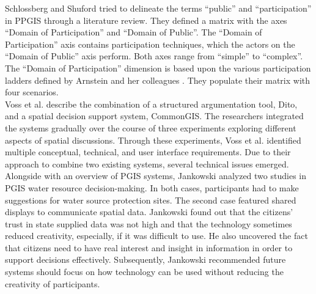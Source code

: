 Schlossberg and Shuford \cite{Schlossberg2005_PPGIS} tried to delineate the terms ``public'' and ``participation'' in PPGIS through a literature review. They defined a matrix with the axes ``Domain of Participation'' and ``Domain of Public''. The ``Domain of Participation'' axis contains participation techniques, which the actors on the ``Domain of Public'' axis perform. Both axes range from ``simple'' to ``complex''. The ``Domain of Participation'' dimension is based upon the various participation ladders defined by Arnstein and her colleagues \cite{Arnstein1969_citizen_participation,Wiedemann1993355,Connor1988_new_ladder}. They populate their matrix with four scenarios. \\
Voss et al. \cite{Voss2004_Evolution_PGIS} describe the combination of a structured argumentation tool, Dito, and a spatial decision support system, CommonGIS. The researchers integrated the systems gradually over the course of three experiments exploring different aspects of spatial discussions. Through these experiments, Voss et al. identified multiple conceptual, technical, and user interface requirements. Due to their approach to combine two existing systems, several technical issues emerged. \\
Alongside with an overview of PGIS systems, Jankowski \cite{Jankowski2005_community_based_pgis} analyzed two studies in PGIS water resource decision-making. In both cases, participants had to make suggestions for water source protection sites. The second case featured shared displays to communicate spatial data. Jankowski found out that the citizens' trust in state supplied data was not high and that the technology sometimes reduced creativity, especially, if it was difficult to use. He also uncovered the fact that citizens need to have real interest and insight in information in order to support decisions effectively. Subsequently, Jankowski recommended future systems should focus on how technology can be used without reducing the creativity of participants.


